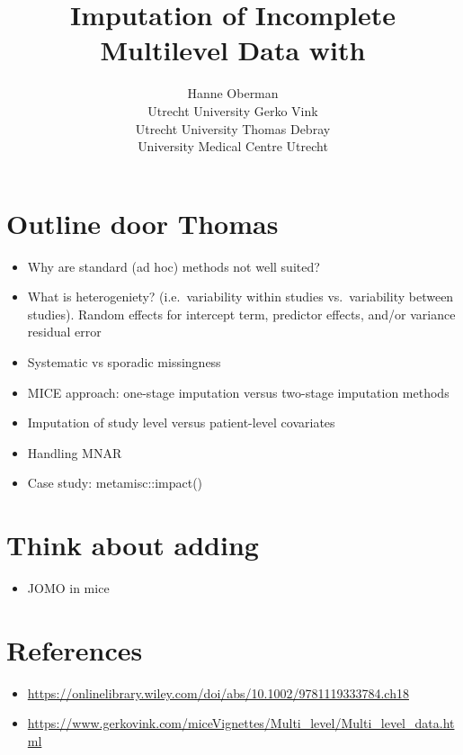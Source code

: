 \documentclass[
]{jss}
\author{
Hanne Oberman\\Utrecht University \And Gerko Vink\\Utrecht
University \And Thomas Debray\\University Medical Centre Utrecht
}
\title{Imputation of Incomplete Multilevel Data with \pkg{mice}}
\providecommand{\tightlist}{%
  \setlength{\itemsep}{0pt}\setlength{\parskip}{0pt}}
\begin{document}
\hypertarget{outline-door-thomas}{%
\section{Outline door Thomas}\label{outline-door-thomas}}

\begin{itemize}
\item
  Why are standard (ad hoc) methods not well suited?
\item
  What is heterogeniety? (i.e.~variability within studies
  vs.~variability between studies). Random effects for intercept term,
  predictor effects, and/or variance residual error
\item
  Systematic vs sporadic missingness
\item
  MICE approach: one-stage imputation versus two-stage imputation
  methods
\item
  Imputation of study level versus patient-level covariates
\item
  Handling MNAR
\item
  Case study: metamisc::impact()
\end{itemize}

\hypertarget{think-about-adding}{%
\section{Think about adding}\label{think-about-adding}}

\begin{itemize}
\tightlist
\item
  JOMO in mice
\end{itemize}

\hypertarget{references}{%
\section{References}\label{references}}

\begin{itemize}
\item
  \href{Chapter:\%20Dealing\%20with\%20Missing\%20Data\%20in\%20an\%20IPD\%20Meta-analysis}{https://onlinelibrary.wiley.com/doi/abs/10.1002/9781119333784.ch18}
\item
  \href{Vignette:\%20gerkovink.com/miceVignettes/Multi_level}{https://www.gerkovink.com/miceVignettes/Multi\_level/Multi\_level\_data.html}
\end{itemize}
\end{document}
